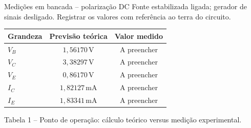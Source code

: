 \documentclass[aspectratio=169,11pt]{beamer}
\newcommand{\aguardando}{\textcolor{MalvaDestaque}{\scriptsize A preencher}}
\begin{document}
\begin{frame}{Medições em bancada -- polarização DC}
  \small
  Fonte estabilizada ligada; gerador de sinais desligado. Registrar os valores
  com referência ao terra do circuito.\par
  \vspace{0.23cm}
  \begin{center}
  \begin{tabular}{lcc}
    \toprule
    \textbf{Grandeza} & \textbf{Previsão teórica} & \textbf{Valor medido}\\
    \midrule
    $V_B$ & $1{,}56170\,\mathrm{V}$ & \aguardando\\
    $V_C$ & $3{,}38297\,\mathrm{V}$ & \aguardando\\
    $V_E$ & $0{,}86170\,\mathrm{V}$ & \aguardando\\
    $I_C$ & $1{,}82127\,\mathrm{mA}$ & \aguardando\\
    $I_E$ & $1{,}83341\,\mathrm{mA}$ & \aguardando\\
    \bottomrule
  \end{tabular}\par
  \vspace{0.20cm}
  {\scriptsize Tabela 1 -- Ponto de operação: cálculo teórico versus medição experimental.}
  \end{center}
\end{frame}


\end{document}
